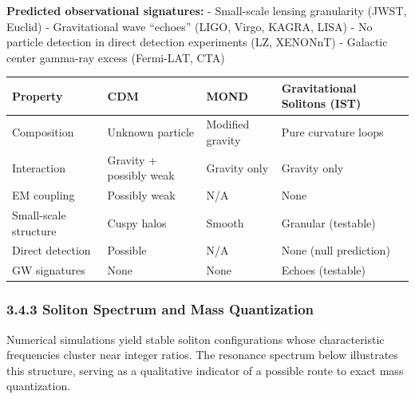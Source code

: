 \documentclass[
  11pt,
]{article}
\begin{document}
\textbf{Predicted observational signatures:} - Small-scale lensing
granularity (JWST, Euclid) - Gravitational wave ``echoes'' (LIGO, Virgo,
KAGRA, LISA) - No particle detection in direct detection experiments
(LZ, XENONnT) - Galactic center gamma-ray excess (Fermi-LAT, CTA)

\begin{longtable}[]{@{}
  >{\raggedright\arraybackslash}p{}
  >{\raggedright\arraybackslash}p{}
  >{\raggedright\arraybackslash}p{}
  >{\raggedright\arraybackslash}p{}@{}}
\toprule\noalign{}
\begin{minipage}[b]{\linewidth}\raggedright
Property
\end{minipage} & \begin{minipage}[b]{\linewidth}\raggedright
CDM
\end{minipage} & \begin{minipage}[b]{\linewidth}\raggedright
MOND
\end{minipage} & \begin{minipage}[b]{\linewidth}\raggedright
Gravitational Solitons (IST)
\end{minipage} \\
\midrule\noalign{}
\endhead
\bottomrule\noalign{}
\endlastfoot
Composition & Unknown particle & Modified gravity & Pure curvature
loops \\
Interaction & Gravity + possibly weak & Gravity only & Gravity only \\
EM coupling & Possibly weak & N/A & None \\
Small-scale structure & Cuspy halos & Smooth & Granular (testable) \\
Direct detection & Possible & N/A & None (null prediction) \\
GW signatures & None & None & Echoes (testable) \\
\end{longtable}

\subsubsection{3.4.3 Soliton Spectrum and Mass
Quantization}\label{soliton-spectrum-and-mass-quantization}

Numerical simulations yield stable soliton configurations whose
characteristic frequencies cluster near integer ratios. The resonance
spectrum below illustrates this structure, serving as a qualitative
indicator of a possible route to exact mass quantization.
\end{document}
